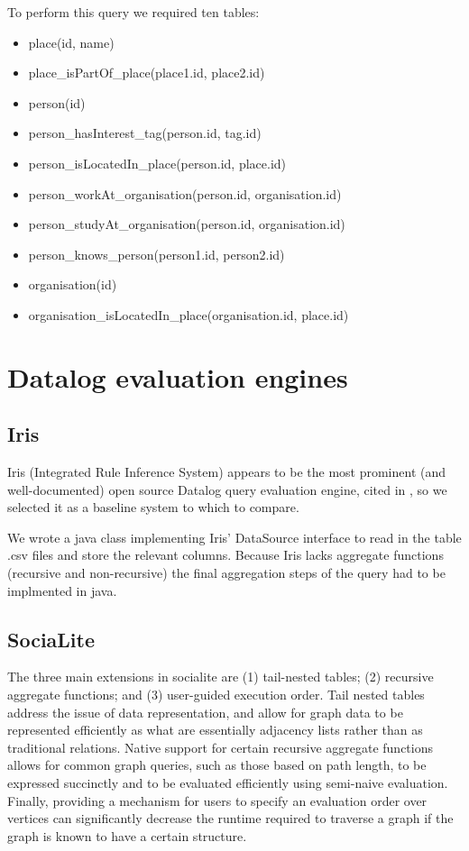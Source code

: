 \documentclass{article}
\begin{document}
\begin{multicols}{2}
To perform this query we required ten tables: 
\begin{itemize}
\item place(id, name)
\item place\_isPartOf\_place(place1.id, place2.id)
\item person(id)
\item person\_hasInterest\_tag(person.id, tag.id)
\item person\_isLocatedIn\_place(person.id, place.id)
\item person\_workAt\_organisation(person.id, organisation.id)
\item person\_studyAt\_organisation(person.id, organisation.id)
\item person\_knows\_person(person1.id, person2.id)
\item organisation(id)
\item organisation\_isLocatedIn\_place(organisation.id, place.id)
\end{itemize}

\section{Datalog evaluation engines}

\subsection{Iris}

Iris (Integrated Rule Inference System) appears to be the most prominent (and well-documented) open source Datalog query evaluation engine, cited in \cite{seo-et-al-13a}, so we selected it as a baseline system to which to compare.

We wrote a java class implementing Iris' DataSource interface to read in the table .csv files and store the relevant columns. Because Iris lacks aggregate functions (recursive and non-recursive) the final aggregation steps of the query had to be implmented in java. 

\subsection{SociaLite}

The three main extensions in socialite are (1) tail-nested tables; (2) recursive aggregate functions; and (3) user-guided execution order. Tail nested tables address the issue of data representation, and allow for graph data to be represented efficiently as what are essentially adjacency lists rather than as traditional relations. Native support for certain recursive aggregate functions allows for common graph queries, such as those based on path length, to be expressed succinctly and to be evaluated efficiently using semi-naive evaluation. Finally, providing a mechanism for users to specify an evaluation order over vertices can significantly decrease the runtime required to traverse a graph if the graph is known to have a certain structure.


\end{multicols}
\end{document}
